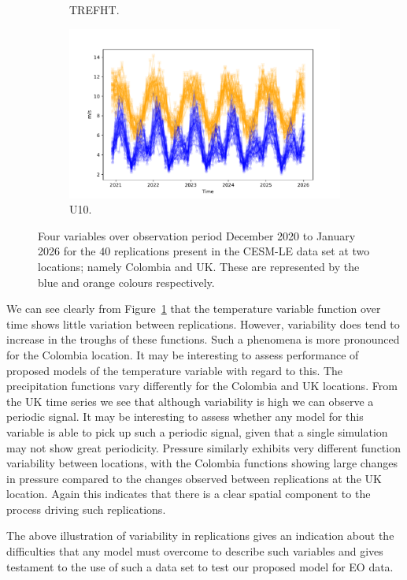 \begin{figure}[htbp!]
\begin{subfigure}[b]{0.45\textwidth}
		\caption{TREFHT.}
		\label{fig:std_temp_temp}   
	\end{subfigure}             
	\begin{subfigure}[b]{0.45\textwidth}
		\includegraphics[width=\textwidth]{U10_std_temp}
		\caption{U10.}
		\label{fig:std_wind_temp}
	\end{subfigure}             
	\caption[Temporal overview of variability of Precipitation, Pressure, Temperature, and Wind speed.]{ Four variables over observation period December 2020 to January 2026 for the $40$ replications present in the CESM-LE data set at two locations; namely Colombia and UK. These are represented by the blue and orange colours respectively.}
	\label{fig:std_overview_temp}
\end{figure}

We can see clearly from Figure~\ref{fig:std_temp_temp} that the temperature variable function over time shows little variation between replications. 
However, variability does tend to increase in the troughs of these functions. 
Such a phenomena is more pronounced for the Colombia location. 
It may be interesting to assess performance of proposed models of the temperature variable with regard to this.
The precipitation functions vary differently for the Colombia and UK locations.
From the UK time series we see that although variability is high we can observe a periodic signal. 
It may be interesting to assess whether any model for this variable is able to pick up such a periodic signal, given that a single simulation may not show great periodicity.
Pressure similarly exhibits very different function variability between locations, with the Colombia functions showing large changes in pressure compared to the changes observed between replications at the UK location. 
Again this indicates that there is a clear spatial component to the process driving such replications. 

The above illustration of variability in replications gives an indication about the difficulties that any model must overcome to describe such variables and gives testament to the use of such a data set to test our proposed model for EO data.






